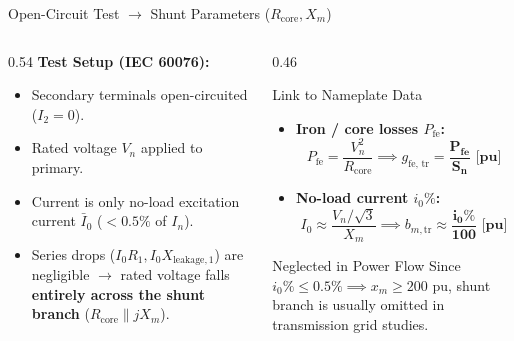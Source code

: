 \begin{frame}{Open-Circuit Test $\to$ Shunt Parameters ($R_{\text{core}}, X_m$)}
\begin{columns}
\begin{column}{0.54\textwidth}
\small
\textbf{Test Setup (IEC 60076):}
\begin{itemize}
    \item Secondary terminals \alert{open-circuited} ($I_2 = 0$).
    \item Rated voltage $V_n$ applied to primary.
    \item Current is only no-load excitation current $\bar{I}_0$ ($< 0.5\%$ of $I_n$).
    \item Series drops ($I_0 R_1, I_0 X_{\text{leakage}, 1}$) are negligible $\to$ rated voltage falls \textbf{entirely across the shunt branch} ($R_{\text{core}} \parallel jX_m$).
\end{itemize}
\normalsize
\end{column}
\begin{column}{0.46\textwidth}
\small
\begin{block}{Link to Nameplate Data}
\begin{itemize}
    \item \textbf{Iron / core losses $P_{\text{fe}}$:}
    $$P_{\text{fe}} = \frac{V_n^2}{R_{\text{core}}} \implies g_{\text{fe, tr}} = \mathbf{\frac{P_{\text{fe}}}{S_n} \text{ [pu]}}$$
    \item \textbf{No-load current $i_0\%$:}
    $$I_0 \approx \frac{V_n/\sqrt{3}}{X_m} \implies b_{m, \text{tr}} \approx \mathbf{\frac{i_0\%}{100} \text{ [pu]}}$$
\end{itemize}
\end{block}
\vspace{-0.2em}
\begin{alertblock}{Neglected in Power Flow}
\footnotesize
Since $i_0\% \le 0.5\% \implies x_m \ge 200\text{ pu}$, shunt branch is usually omitted in transmission grid studies.
\end{alertblock}
\normalsize
\end{column}
\end{columns}
\end{frame}

